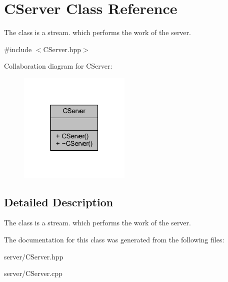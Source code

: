 \hypertarget{class_c_server}{}\section{C\+Server Class Reference}
\label{class_c_server}


The class is a stream. which performs the work of the server.  




{\ttfamily \#include $<$C\+Server.\+hpp$>$}



Collaboration diagram for C\+Server\+:
\nopagebreak
\begin{figure}[H]
\begin{center}
\leavevmode
\includegraphics[width=151pt]{class_c_server__coll__graph}
\end{center}
\end{figure}


\subsection{Detailed Description}
The class is a stream. which performs the work of the server. 

The documentation for this class was generated from the following files\+:\begin{DoxyCompactItemize}
\item 
server/C\+Server.\+hpp\item 
server/C\+Server.\+cpp\end{DoxyCompactItemize}
